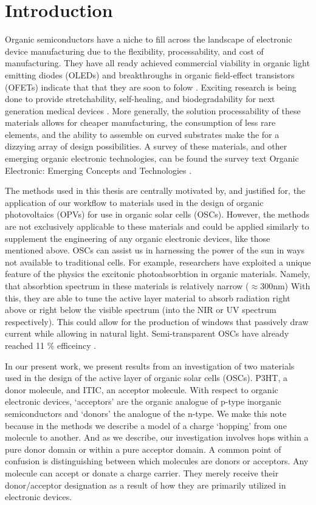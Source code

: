 \chapter{Introduction} 
Organic semiconductors have a niche to fill across the landscape of electronic
device manufacturing due to the flexibility, processability, and cost of manufacturing. They have all ready
achieved commercial viability in organic light emitting
diodes (OLEDs) \cite{Song2020} and breakthroughs in organic field-effect transistors (OFETs)
indicate that that they are soon to folow \cite{Chen2020}. Exciting research is being done to provide stretchability, self-healing, and biodegradability for 
next generation medical devices \cite{Brutting2006}.
More generally, the solution processability of these materials allows for
cheaper manufacturing, the consumption of less rare elements, 
and the ability to assemble on curved substrates make the for a dizzying array of design possibilities. 
A survey of these materials, and 
other emerging organic electronic technologies, can be found the survey text 
Organic Electronic: Emerging Concepts and Technologies
\cite{FabioCicoiraEditor2013}. 

The methods used in this thesis are centrally motivated by, and justified for, 
the application of our workflow to materials
used in the design of organic photovoltaics (OPVs) for use in organic solar cells (OSCs). However, the methods are
not exclusively applicable to these materials and could be applied similarly to  supplement the engineering of any organic
electronic devices, like those mentioned above. 
OSCs can assist us in harnessing the power of the sun in ways not available to traditional cells. 
For example, researchers have exploited a unique feature of the physics the excitonic photoabsorbtion in 
organic materials.  Namely, that absorbtion spectrum
in these materials is relatively narrow ($\approx$300nm)
With this, they are able to tune the active layer material to absorb radiation right above or right below the
visible spectrum (into the NIR or UV spectrum respectively). This 
could allow for the production of windows that passively draw current while allowing in natural light. Semi-transparent OSCs have already
reached 11 \% efficeincy \cite{Brabec2020}. 

In our present work, we present results from an investigation of two materials
used in the design of the active layer of organic solar cells (OSCs). P3HT, a
donor molecule, and ITIC, an acceptor molecule. With respect to organic electronic devices, `acceptors' are the
organic analogue of p-type inorganic semiconductors and `donors' the analogue
of the n-type. We make this note because in the methods we describe a model of
a charge `hopping' from one molecule to another. And as we describe, our
investigation involves hops within a pure donor domain or within a pure
acceptor domain. A common point of confusion is distinguishing between which
molecules are donors or acceptors.
Any molecule can accept or donate a charge carrier.
They merely receive their donor/acceptor designation as a result of how they
are primarily utilized in electronic devices. 

